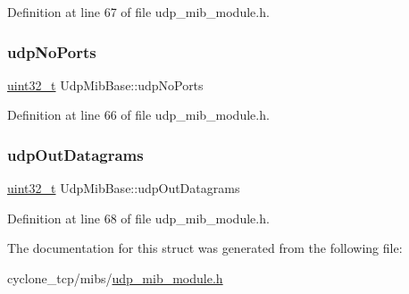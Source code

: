 Definition at line 67 of file udp\+\_\+mib\+\_\+module.\+h.

\mbox{\label{structUdpMibBase_a10dde211613021637519b666d9c06834}} 
\subsubsection{\texorpdfstring{udp\+No\+Ports}{udpNoPorts}}
{\footnotesize\ttfamily \hyperlink{stdint_8h_a435d1572bf3f880d55459d9805097f62}{uint32\+\_\+t} Udp\+Mib\+Base\+::udp\+No\+Ports}



Definition at line 66 of file udp\+\_\+mib\+\_\+module.\+h.

\mbox{\label{structUdpMibBase_a9d25a778c0594872a0961d3b40de78b8}} 
\subsubsection{\texorpdfstring{udp\+Out\+Datagrams}{udpOutDatagrams}}
{\footnotesize\ttfamily \hyperlink{stdint_8h_a435d1572bf3f880d55459d9805097f62}{uint32\+\_\+t} Udp\+Mib\+Base\+::udp\+Out\+Datagrams}



Definition at line 68 of file udp\+\_\+mib\+\_\+module.\+h.



The documentation for this struct was generated from the following file\+:\begin{DoxyCompactItemize}
\item 
cyclone\+\_\+tcp/mibs/\hyperlink{udp__mib__module_8h}{udp\+\_\+mib\+\_\+module.\+h}\end{DoxyCompactItemize}

